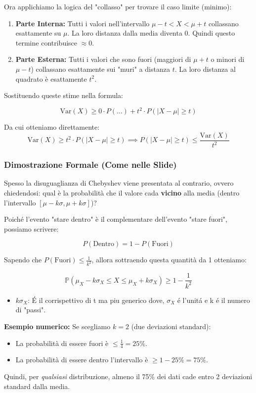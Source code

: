 Ora applichiamo la logica del "collasso" per trovare il caso limite (minimo):
\begin{enumerate}
    \item \textbf{Parte Interna:} Tutti i valori nell'intervallo $\mu-t < X < \mu+t$ collassano esattamente su $\mu$.
    La loro distanza dalla media diventa $0$. Quindi questo termine contribuisce $\approx 0$.
    
    \item \textbf{Parte Esterna:} Tutti i valori che sono fuori (maggiori di $\mu+t$ o minori di $\mu-t$) collassano esattamente sui "muri" a distanza $t$.
    La loro distanza al quadrato è esattamente $t^2$.
\end{enumerate}

Sostituendo queste stime nella formula:

\[
\text{Var}(X) \ge 0 \cdot P(\dots) + t^2 \cdot P(|X-\mu| \ge t)
\]

Da cui otteniamo direttamente:
\[
\text{Var}(X) \ge t^2 \cdot P(|X-\mu| \ge t) \implies P(|X-\mu| \ge t) \le \frac{\text{Var}(X)}{t^2}
\]

\subsubsection{Dimostrazione Formale (Come nelle Slide)}
Spesso la disuguaglianza di Chebyshev viene presentata al contrario, ovvero chiedendosi: qual è la probabilità che il valore cada \textbf{vicino} alla media (dentro l'intervallo $[\mu - k\sigma, \mu + k\sigma]$)?

Poiché l'evento "stare dentro" è il complementare dell'evento "stare fuori", possiamo scrivere:

\[
P(\text{Dentro}) = 1 - P(\text{Fuori})
\]

Sapendo che $P(\text{Fuori}) \le \frac{1}{k^2}$, allora sottraendo questa quantità da 1 otteniamo:

\begin{equation}
\boxed{\mathbb{P}(\mu_X - k\sigma_X \le X \le \mu_X + k\sigma_X) \ge 1 - \frac{1}{k^2}}
\end{equation}
\begin{itemize}
    \item $k\sigma_X$: É il corrispettivo di t ma piu generico dove, $\sigma_X$ é l'unitá e k é il numero di "passi".
\end{itemize}


\textbf{Esempio numerico:}
Se scegliamo $k=2$ (due deviazioni standard):
\begin{itemize}
    \item La probabilità di essere fuori è $\le \frac{1}{4} = 25\%$.
    \item La probabilità di essere dentro l'intervallo è $\ge 1 - 25\% = 75\%$.
\end{itemize}
Quindi, per \textit{qualsiasi} distribuzione, almeno il 75\% dei dati cade entro 2 deviazioni standard dalla media.

